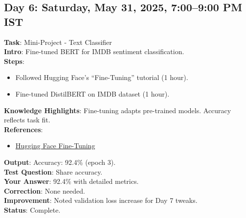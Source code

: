 \documentclass[a4paper,12pt]{article}
\begin{document}
\subsection*{Day 6: Saturday, May 31, 2025, 7:00--9:00 PM IST}
\textbf{Task}: Mini-Project - Text Classifier \\
\textbf{Intro}: Fine-tuned BERT for IMDB sentiment classification. \\
\textbf{Steps}:
\begin{itemize}
    \item Followed Hugging Face’s ``Fine-Tuning'' tutorial (1 hour).
    \item Fine-tuned DistilBERT on IMDB dataset (1 hour).
\end{itemize}
\textbf{Knowledge Highlights}: Fine-tuning adapts pre-trained models. Accuracy reflects task fit. \\
\textbf{References}: 
\begin{itemize}
    \item \href{https://huggingface.co/docs/transformers/training}{Hugging Face Fine-Tuning}
\end{itemize}
\textbf{Output}: Accuracy: 92.4\% (epoch 3). \\
\textbf{Test Question}: Share accuracy. \\
\textbf{Your Answer}: 92.4\% with detailed metrics. \\
\textbf{Correction}: None needed. \\
\textbf{Improvement}: Noted validation loss increase for Day 7 tweaks. \\
\textbf{Status}: Complete.

\end{document}
